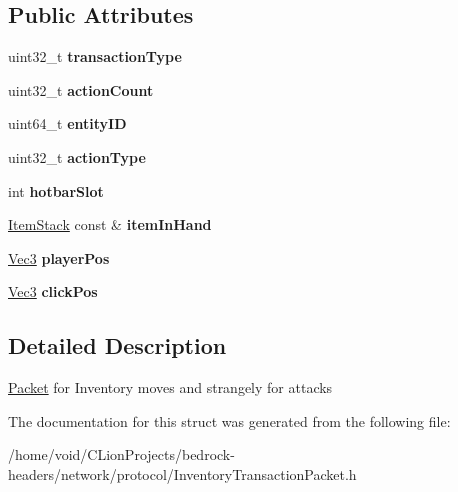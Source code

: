 \subsection*{Public Attributes}
\begin{DoxyCompactItemize}
\item 
\mbox{\label{struct_inventory_transaction_packet_a257bcf6ae0f18218bd98edb90a24728f}} 
uint32\+\_\+t {\bfseries transaction\+Type}
\item 
\mbox{\label{struct_inventory_transaction_packet_a9599b72e1ee2ead41fc2a14c0c28f6b7}} 
uint32\+\_\+t {\bfseries action\+Count}
\item 
\mbox{\label{struct_inventory_transaction_packet_a0362fd16604d48210d614276af9a7429}} 
uint64\+\_\+t {\bfseries entity\+ID}
\item 
\mbox{\label{struct_inventory_transaction_packet_ac4d4d8e59e414ecbbb0789fc84b55abe}} 
uint32\+\_\+t {\bfseries action\+Type}
\item 
\mbox{\label{struct_inventory_transaction_packet_a16e1d11434856a07b20a0bf9ad9b6e97}} 
int {\bfseries hotbar\+Slot}
\item 
\mbox{\label{struct_inventory_transaction_packet_a9e73075233484766d36adbaaab2edb24}} 
\mbox{\hyperlink{struct_item_stack}{Item\+Stack}} const  \& {\bfseries item\+In\+Hand}
\item 
\mbox{\label{struct_inventory_transaction_packet_a8cb7230ca00a9824ebf5eb3c7232c422}} 
\mbox{\hyperlink{struct_vec3}{Vec3}} {\bfseries player\+Pos}
\item 
\mbox{\label{struct_inventory_transaction_packet_a76357a1aebf8cfb59f3250c2fb06684b}} 
\mbox{\hyperlink{struct_vec3}{Vec3}} {\bfseries click\+Pos}
\end{DoxyCompactItemize}


\subsection{Detailed Description}
\mbox{\hyperlink{struct_packet}{Packet}} for Inventory moves and strangely for attacks 

The documentation for this struct was generated from the following file\+:\begin{DoxyCompactItemize}
\item 
/home/void/\+C\+Lion\+Projects/bedrock-\/headers/network/protocol/Inventory\+Transaction\+Packet.\+h\end{DoxyCompactItemize}
